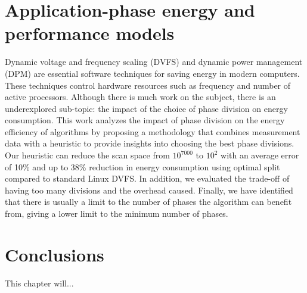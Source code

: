 \documentclass[
papersize=a4,
pagelayout=default,
fontname=latinmodern,
fontsize=11pt,
twoside,
final,
faculty=fpms,
]{umons-Thesis}
\begin{document}
	
	
	\chapter{Application-phase energy and performance models}
	Dynamic voltage and frequency scaling (DVFS) and dynamic power management (DPM) are essential software techniques for saving energy in modern computers. These techniques control hardware resources such as frequency and number of active processors. Although there is much work on the subject, there is an underexplored sub-topic: the impact of the choice of phase division on energy consumption. This work analyzes the impact of phase division on the energy efficiency of algorithms by proposing a methodology that combines measurement data with a heuristic to provide insights into choosing the best phase divisions. Our heuristic can reduce the scan space from $10^{7000}$ to $10^2$ with an average error of 10\% and up to 38\% reduction in energy consumption using optimal split compared to standard Linux DVFS. In addition, we evaluated the trade-off of having too many divisions and the overhead caused. Finally, we have identified that there is usually a limit to the number of phases the algorithm can benefit from, giving a lower limit to the minimum number of phases.
	
	
	
	\chapter{Conclusions}
	This chapter will...
	
	
	
	
	\backmatter
	
\end{document}
